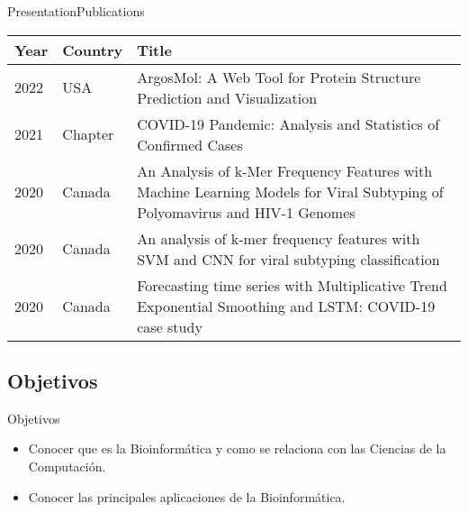 \documentclass[10pt]{beamer}
\newcommand{\1}{
        	\setbeamertemplate{background}{
        		\texttt{[image: img/1]}
        		\tikz[overlay] \fill[fill opacity=0.75,fill=white] (0,0) rectangle (-\paperwidth,\paperheight);
        	}
}
\begin{document}
\begin{frame}{Presentation}{Publications}
	\begin{table}[]
		\setlength{\tabcolsep}{0.5em} %
		{\renewcommand{\arraystretch}{1.4}%
			\begin{tabular}{llp{7cm}}
				\textbf{Year} & \textbf{Country} & \textbf{Title}                                                                                                              \\
				\hline
				2022          &  USA                & ArgosMol: A Web Tool for Protein Structure Prediction and Visualization             \\
				2021          &  Chapter                & COVID-19 Pandemic: Analysis and Statistics of Confirmed Cases             \\
				2020          &  Canada          & An Analysis of k-Mer Frequency Features with Machine Learning Models for Viral Subtyping of Polyomavirus and HIV-1 Genomes                                                        \\
				
				2020          & Canada           & An analysis of k-mer frequency features with SVM and CNN for viral subtyping classification \\
				2020          & Canada           & Forecasting time series with Multiplicative Trend Exponential Smoothing and LSTM: COVID-19 case study                       \\
				
				
			\end{tabular}
		}
	\end{table}
\end{frame}

\subsection{Objetivos}

\begin{frame}{Objetivos}{}
	\begin{block}{}
		\begin{itemize}
			\item Conocer que es la Bioinformática y como se relaciona con las Ciencias de la Computación.
			\item Conocer las principales aplicaciones de la Bioinformática.
		\end{itemize}
	\end{block}
\end{frame}
\end{document}
